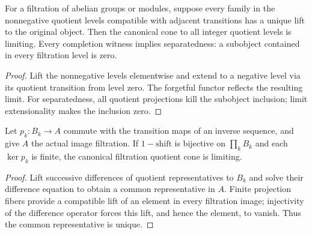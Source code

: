 \begin{proposition}
  \label{prop:completion-unique-nat-lifts}
  \leanok
  For a filtration of abelian groups or modules, suppose every family
  in the nonnegative quotient levels compatible with adjacent transitions
  has a unique lift to the original object. Then the canonical cone to
  all integer quotient levels is limiting. Every completion witness
  implies separatedness: a subobject contained in every filtration level
  is zero.
\end{proposition}
\begin{proof}
  Lift the nonnegative levels elementwise and extend to a negative level
  via its quotient transition from level zero. The forgetful functor
  reflects the resulting limit. For separatedness, all quotient
  projections kill the subobject inclusion; limit extensionality makes
  the inclusion zero.
  \leanok
\end{proof}

\begin{proposition}
  \label{prop:residual-image-filtration-complete}
  \leanok
  Let $p_k:B_k\to A$ commute with the transition maps of an inverse
  sequence, and give $A$ the actual image filtration. If $1-\mathrm{shift}$
  is bijective on $\prod_k B_k$ and each $\ker p_k$ is finite, the
  canonical filtration quotient cone is limiting.
\end{proposition}
\begin{proof}
  Lift successive differences of quotient representatives to $B_k$ and
  solve their difference equation to obtain a common representative in
  $A$. Finite projection fibers provide a compatible lift of an element
  in every filtration image; injectivity of the difference operator
  forces this lift, and hence the element, to vanish. Thus the common
  representative is unique.
  \leanok
\end{proof}

